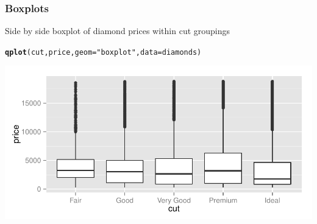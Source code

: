 \documentclass{beamer}\usepackage[]{graphicx}\usepackage[]{color}
\makeatletter
\newcommand{\hlstr}[1]{\textcolor[rgb]{0.192,0.494,0.8}{#1}}%
\newcommand{\hlstd}[1]{\textcolor[rgb]{0.345,0.345,0.345}{#1}}%
\newcommand{\hlkwc}[1]{\textcolor[rgb]{0.333,0.667,0.333}{#1}}%
\newcommand{\hlkwd}[1]{\textcolor[rgb]{0.737,0.353,0.396}{\textbf{#1}}}%
\newenvironment{kframe}{%
 \def\at@end@of@kframe{}%
 \ifinner\ifhmode%
  \def\at@end@of@kframe{\end{minipage}}%
  \begin{minipage}{\columnwidth}%
 \fi\fi%
 \def\FrameCommand##1{\hskip\@totalleftmargin \hskip-\fboxsep
 \colorbox{shadecolor}{##1}\hskip-\fboxsep
     \hskip-\linewidth \hskip-\@totalleftmargin \hskip\columnwidth}%
 \MakeFramed {\advance\hsize-\width
   \@totalleftmargin\z@ \linewidth\hsize
   \@setminipage}}%
 {\par\unskip\endMakeFramed%
 \at@end@of@kframe}
\newenvironment{knitrout}{}{} %
\makeatother
\begin{document}

\begin{frame}[fragile]
\frametitle{Boxplots}
    
    Side by side boxplot of diamond prices within cut groupings
    
\footnotesize
\begin{knitrout}\footnotesize
{}\color{fgcolor}\begin{kframe}
\begin{alltt}
\hlkwd{qplot}\hlstd{(cut, price,} \hlkwc{geom}\hlstd{=}\hlstr{"boxplot"}\hlstd{,} \hlkwc{data}\hlstd{=diamonds)}
\end{alltt}
\end{kframe}

{\centering \includegraphics[width=.9\linewidth]{figure/kdiamondbox1} 

}



\end{knitrout}
\normalsize
\end{frame}

\end{document}
